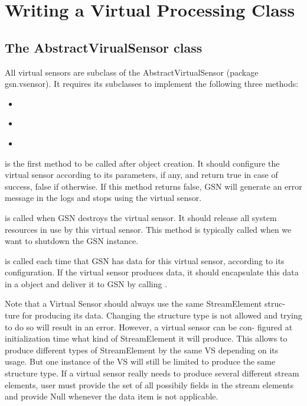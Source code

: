 \graphicspath{{chapters/ch-developer-guide/figures/}}

\section{Writing a Virtual Processing Class}

\subsection{The AbstractVirualSensor class}

All virtual sensors are subclass of the AbstractVirtualSensor (package gsn.vsensor).
It requires its subclasses to implement the following three methods:
\begin{itemize}
 \item {}\\
 \item {}\\
 \item {}\\
\end{itemize}
 is the first method to be called after object creation. It should
configure the virtual sensor according to its parameters, if any, and return true
in case of success, false if otherwise. If this method returns false, GSN will
generate an error message in the logs and stops using the virtual sensor.

 is called when GSN destroys the virtual sensor. It should release
all system resources in use by this virtual sensor. This method is typically called
when we want to shutdown the GSN instance.

 is called each time that GSN has data for this virtual sensor,
according to its configuration. If the virtual sensor produces data, it should
encapsulate this data in a  object and deliver it to GSN by
calling .

Note that a Virtual Sensor should always use the same StreamElement struc-
ture for producing its data. Changing the structure type is not allowed and
trying to do so will result in an error. However, a virtual sensor can be con-
figured at initialization time what kind of StreamElement it will produce. This
allows to produce different types of StreamElement by the same VS depending
on its usage. But one instance of the VS will still be limited to produce the
same structure type. If a virtual sensor really needs to produce several different
stream elements, user must provide the set of all possibily fields in the stream
elements and provide Null whenever the data item is not applicable.

